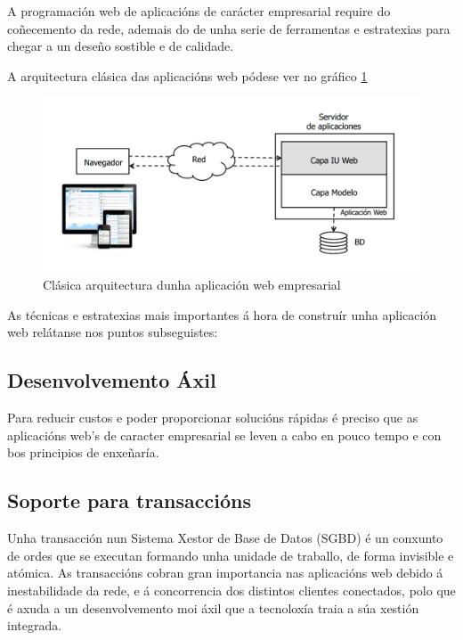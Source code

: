 	A programación web de aplicacións de carácter empresarial require do coñecemento da rede, ademais
	do de unha serie de ferramentas e estratexias para chegar a un deseño sostible e de calidade.
	
	A arquitectura clásica das aplicacións web pódese ver no gráfico \ref{fig:ArquitecturaAppWeb}
	
	\begin{figure}[htp]
	\begin{center}
		\includegraphics[scale=0.35]{figures/ArquitecturaAppWeb.png}
		\caption{Clásica arquitectura dunha aplicación web empresarial}
	\label{fig:ArquitecturaAppWeb}
	\end{center}
	\end{figure}

	As técnicas e estratexias mais importantes á hora de construír unha aplicación web relátanse nos
	puntos subseguistes:
	
	\subsection {Desenvolvemento Áxil}
		Para reducir custos e poder proporcionar solucións rápidas é preciso que as 
		aplicacións web's de caracter empresarial se leven a cabo en pouco tempo e con
		bos principios de enxeñaría.
	
	\subsection{Soporte para transaccións}
		Unha transacción nun Sistema Xestor de Base de Datos (SGBD) é un conxunto de ordes que
		se executan formando unha unidade de traballo, de forma invisible e atómica. 
		As transaccións cobran gran importancia nas aplicacións web debido á inestabilidade 
		da rede, e á concorrencia dos distintos clientes conectados, polo que é axuda a un 
		desenvolvemento moi áxil que a tecnoloxía traia a súa xestión integrada.
	
